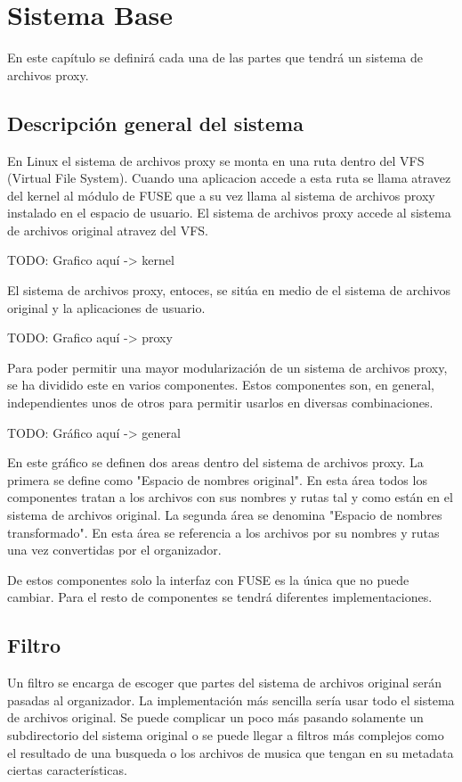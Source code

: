 \chapter{Sistema Base}
\label{sistema_base}

En este capítulo se definirá cada una de las partes que tendrá un sistema de archivos proxy.

\section{Descripción general del sistema}
\label{descripcion_general}

En Linux el sistema de archivos proxy se monta en una ruta dentro del VFS (Virtual File System). Cuando una aplicacion accede a esta ruta se llama atravez del kernel al módulo de FUSE que a su vez llama al sistema de archivos proxy instalado en el espacio de usuario. El sistema de archivos proxy accede al sistema de archivos original atravez del VFS.

TODO: Grafico aquí -> kernel

El sistema de archivos proxy, entoces, se sitúa en medio de el sistema de archivos original y la aplicaciones de usuario.

TODO: Grafico aquí -> proxy

Para poder permitir una mayor modularización de un sistema de archivos proxy, se ha dividido este en varios componentes. Estos componentes son, en general, independientes unos de otros para permitir usarlos en diversas combinaciones.

TODO: Gráfico aquí -> general

En este gráfico se definen dos areas dentro del sistema de archivos proxy. La primera se define como "Espacio de nombres original". En esta área todos los componentes tratan a los archivos con sus nombres y rutas tal y como están en el sistema de archivos original. La segunda área se denomina "Espacio de nombres transformado". En esta área se referencia a los archivos por su nombres y rutas una vez convertidas por el organizador.

De estos componentes solo la interfaz con FUSE es la única que no puede cambiar. Para el resto de componentes se tendrá diferentes implementaciones.


\section{Filtro}
\label{filtro}

Un filtro se encarga de escoger que partes del sistema de archivos original serán pasadas al organizador. La implementación más sencilla sería usar todo el sistema de archivos original. Se puede complicar un poco más pasando solamente un subdirectorio del sistema original o se puede llegar a filtros más complejos como el resultado de una busqueda o los archivos de musica que tengan en su metadata ciertas características.

